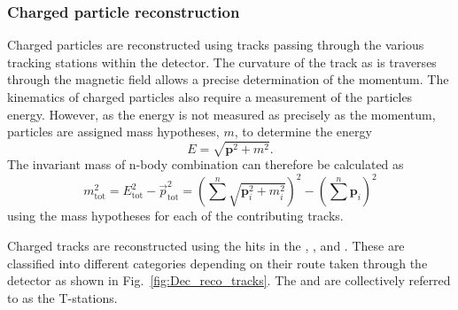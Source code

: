 \subsubsection{Charged particle reconstruction}
Charged particles are reconstructed using tracks passing through the various tracking stations within the \lhcb detector. The curvature of the track as is traverses through the magnetic field allows a precise determination of the momentum. The kinematics of charged particles also require a measurement of the particles energy. However, as the energy is not measured as precisely as the momentum, particles are assigned mass hypotheses, $m$, to determine the energy
\begin{equation}
E = \sqrt{\boldsymbol{p}^{2}+m^{2}}.
\end{equation} 
The invariant mass of n-body combination can therefore be calculated as
\begin{equation}
m^{2}_\text{tot} = E_{\text{tot}}^{2} - \vec{p}_\text{tot}^2 = \left(\sum^{n} \sqrt{\boldsymbol{p}_{i}^{2}+m_{i}^{2}}\right)^{2} - \left(\sum^{n} \boldsymbol{p}_{i}\right)^2
\end{equation}
using the mass hypotheses for each of the contributing tracks.

Charged tracks are reconstructed using the hits in the \velo, \ttracker, \intr and \ot. These are classified into different categories depending on their route taken through the detector as shown in Fig.~\ref{fig:Dec_reco_tracks}. The \intr and \ot are collectively referred to as the T-stations. 

